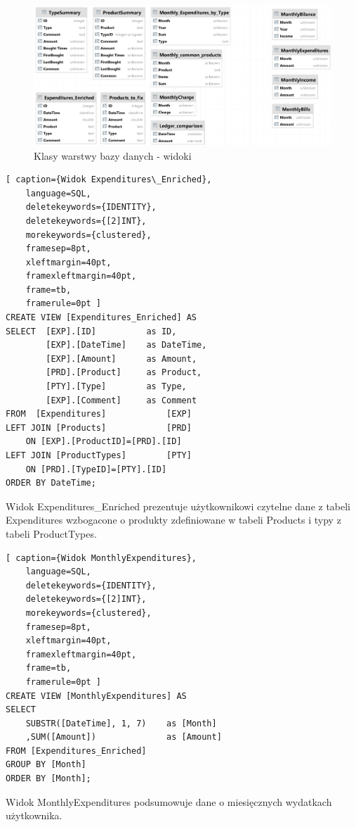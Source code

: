 \documentclass[a4paper,10pt, twoside]{report}
\begin{document}

\begin{figure}[H]           %
    \caption{Klasy warstwy bazy danych - widoki}
    \label{fig:Klasy warstwy bazy danych - widoki}
    \centering  
    \includegraphics[width=12cm]{figures/Budgeter_Finances-db_Views_DataGrid.png}
\end{figure}

\begin{minipage}{\textwidth}
\begin{lstlisting}[ caption={Widok Expenditures\_Enriched},
    language=SQL,
    deletekeywords={IDENTITY},
    deletekeywords={[2]INT},
    morekeywords={clustered},
    framesep=8pt,
    xleftmargin=40pt,
    framexleftmargin=40pt,
    frame=tb,
    framerule=0pt ]
CREATE VIEW [Expenditures_Enriched] AS
SELECT  [EXP].[ID]          as ID,
        [EXP].[DateTime]    as DateTime,
        [EXP].[Amount]      as Amount,
        [PRD].[Product]     as Product,
        [PTY].[Type]        as Type,
        [EXP].[Comment]     as Comment
FROM  [Expenditures]            [EXP]
LEFT JOIN [Products]            [PRD]	
    ON [EXP].[ProductID]=[PRD].[ID]
LEFT JOIN [ProductTypes]        [PTY]
    ON [PRD].[TypeID]=[PTY].[ID]
ORDER BY DateTime;
\end{lstlisting}
{Widok Expenditures\_Enriched prezentuje użytkownikowi czytelne dane z tabeli 
Expenditures wzbogacone o produkty zdefiniowane w tabeli Products i typy z 
tabeli ProductTypes.}
\end{minipage}

\begin{minipage}{\textwidth}
\begin{lstlisting}[ caption={Widok MonthlyExpenditures},
    language=SQL,
    deletekeywords={IDENTITY},
    deletekeywords={[2]INT},
    morekeywords={clustered},
    framesep=8pt,
    xleftmargin=40pt,
    framexleftmargin=40pt,
    frame=tb,
    framerule=0pt ]
CREATE VIEW [MonthlyExpenditures] AS
SELECT 
    SUBSTR([DateTime], 1, 7)    as [Month]
    ,SUM([Amount])              as [Amount]
FROM [Expenditures_Enriched]
GROUP BY [Month]
ORDER BY [Month];
\end{lstlisting}
{Widok MonthlyExpenditures podsumowuje dane o miesięcznych wydatkach użytkownika.}
\end{minipage}
\end{document}
